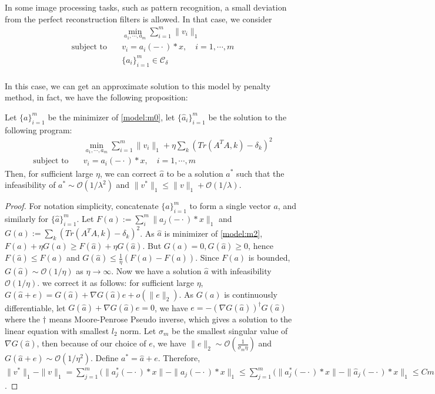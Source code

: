 \documentclass[a4paper]{article}
\begin{document}
In some image processing tasks, such as pattern recognition, a small deviation from the perfect reconstruction filters is allowed. In that case, we consider
\begin{equation}
\label{model:m1}
	\begin{aligned}
		&\min_{a_1,\cdots,a_m} \sum_{i=1}^m \|v_i\|_1 \\
		\textrm{subject to} \quad&v_i = a_i(-\cdot)*x,\quad i=1,\cdots,m\\
		 & \{a_i\}_{i=1}^m \in \mathcal{C_\delta} \\
	\end{aligned}
\end{equation}

In this case, we can get an approximate solution to this model by penalty method, in fact, we have the following proposition:
\begin{prop}
Let $\{a\}_{i=1}^m$ be the minimizer of \eqref{model:m0}, let $\{\hat{a}_i\}_{i=1}^m$ be the solution to the following program:
\begin{equation}
	\label{model:m2}
	\begin{aligned}
		&\min_{a_1,\cdots,a_m} \sum_{i=1}^m \|v_i\|_1 + \eta \sum_k (Tr(A^TA,k)-\delta_k)^2 \\
		\textrm{subject to} \quad &v_i = a_i(-\cdot)*x,\quad i=1,\cdots,m
	\end{aligned}
\end{equation}
Then, for sufficient large $\eta$, we can correct $\hat{a}$ to be a solution $a^*$ such that the infeasibility of $a^* \sim \mathcal{O}(1/\lambda^2)$ and $\|v^*\|_1 \leq \|v\|_1 + \mathcal{O}(1/\lambda)$.
\end{prop}
\begin{proof}
	For notation simplicity, concatenate $\{a\}_{i=1}^m$ to form a single vector $a$, and similarly for $\{\hat{a}\}_{i=1}^m$. Let $F(a):=\sum_{i}^{m} \|a_j(-\cdot)*x\|_1$ and $G(a):= \sum_k (Tr(A^TA,k)-\delta_k)^2 $. 
	As $\hat{a}$ is minimizer of \eqref{model:m2}, $ F(a)+\eta G(a) \geq F(\hat{a}) + \eta G(\hat{a})$. But $G(a)=0, G(\hat{a})\geq 0$, hence $F(\hat{a})\leq F(a)$ and $G(\hat{a}) \leq \frac{1}{\eta} (F(a)-F(\hat{a}))$. Since $F(a)$ is bounded, $G(\hat{a}) \sim \mathcal{O}(1/\eta)$ as $\eta\rightarrow\infty$. Now we have a solution $\hat{a}$ with infeasibility $\mathcal{O}(1/\eta)$. we correct it as follows: for sufficient large $\eta$, $G(\hat{a}+e)=G(\hat{a})+\nabla G(\hat{a})e + o(\|e\|_2)$. As $G(a)$ is continuously differentiable, let $G(\hat{a})+\nabla G(\hat{a})e =0$, we have $e=-(\nabla G(\hat{a}))^{\dagger} G(\hat{a})$ where the $\dagger$ means Moore-Penrose Pseudo inverse, which gives a solution to the linear equation with smallest $l_2$ norm. Let $\sigma_m$ be the smallest singular value of $\nabla G(\hat{a})$, then because of our choice of $e$, we have $\|e\|_2 \sim \mathcal{O}(\frac{1}{\sigma_m \eta})$ and $G(\hat{a}+e)\sim \mathcal{O}(1/\eta^2)$. Define $a^*=\hat{a}+e$. Therefore, $\|v^*\|_1 - \|v\|_1 =\sum_{j=1}^m (\|a^*_j(-\cdot)*x\|-\|a_j(-\cdot)*x\|_1\leq \sum_{j=1}^m (\|a^*_j(-\cdot)*x\|-\|\hat{a}_j(-\cdot)*x\|_1\leq Cm\|e\|_1\leq C\sqrt{mr}\|e\|_2\leq C\frac{\sqrt{mr}}{\sigma_m\eta}$.
	
		\end{proof}
\end{document}
